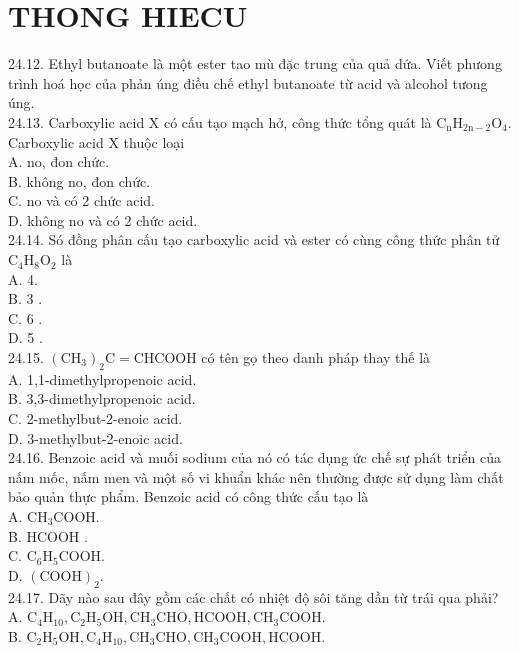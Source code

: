 \documentclass[10pt]{article}
\begin{document}
\section*{THONG HIECU}
24.12. Ethyl butanoate là một ester tao mù đặc trung của quả dứa. Viết phưong trình hoá học của phản úng điều chế ethyl butanoate từ acid và alcohol tưong úng.\\
24.13. Carboxylic acid X có cấu tạo mạch hở, công thức tổng quát là $\mathrm{C}_{\mathrm{n}} \mathrm{H}_{2 \mathrm{n}-2} \mathrm{O}_{4}$. Carboxylic acid X thuộc loại\\
A. no, đon chức.\\
B. không no, đon chức.\\
C. no và có 2 chức acid.\\
D. không no và có 2 chức acid.\\
24.14. Só đồng phân cấu tạo carboxylic acid và ester có cùng công thức phân tử $\mathrm{C}_{4} \mathrm{H}_{8} \mathrm{O}_{2}$ là\\
A. 4.\\
B. 3 .\\
C. 6 .\\
D. 5 .\\
24.15. $\left(\mathrm{CH}_{3}\right)_{2} \mathrm{C}=\mathrm{CHCOOH}$ có tên gọ theo danh pháp thay thế là\\
A. 1,1-dimethylpropenoic acid.\\
B. 3,3-dimethylpropenoic acid.\\
C. 2-methylbut-2-enoic acid.\\
D. 3-methylbut-2-enoic acid.\\
24.16. Benzoic acid và muối sodium của nó có tác dụng ức chế sự phát triển của nấm mốc, nấm men và một số vi khuẩn khác nên thường được sử dụng làm chất bảo quản thực phẩm. Benzoic acid có công thức cấu tạo là\\
A. $\mathrm{CH}_{3} \mathrm{COOH}$.\\
B. HCOOH .\\
C. $\mathrm{C}_{6} \mathrm{H}_{5} \mathrm{COOH}$.\\
D. $(\mathrm{COOH})_{2}$.\\
24.17. Dãy nào sau đây gồm các chất có nhiệt độ sôi tăng dần từ trái qua phải?\\
A. $\mathrm{C}_{4} \mathrm{H}_{10}, \mathrm{C}_{2} \mathrm{H}_{5} \mathrm{OH}, \mathrm{CH}_{3} \mathrm{CHO}, \mathrm{HCOOH}, \mathrm{CH}_{3} \mathrm{COOH}$.\\
B. $\mathrm{C}_{2} \mathrm{H}_{5} \mathrm{OH}, \mathrm{C}_{4} \mathrm{H}_{10}, \mathrm{CH}_{3} \mathrm{CHO}, \mathrm{CH}_{3} \mathrm{COOH}, \mathrm{HCOOH}$.\\
\end{document}
